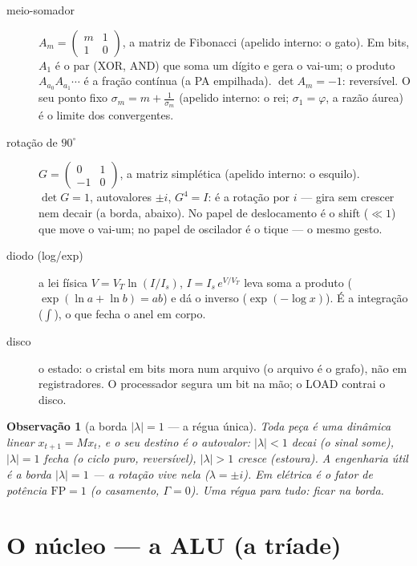 \documentclass[11pt,a4paper]{article}
\newtheorem{observacao}{Observação}
\begin{document}
\begin{description}
\item[meio-somador]
$A_{m}=\begin{pmatrix}m&1\\1&0\end{pmatrix}$, a matriz de Fibonacci (apelido interno: o gato).
Em bits, $A_{1}$ é o par (XOR, AND) que soma um dígito e gera o vai-um; o produto
$A_{a_{0}}A_{a_{1}}\cdots$ é a fração contínua (a PA empilhada). $\det A_{m}=-1$: reversível.
O seu ponto fixo $\sigma_{m}=m+\frac{1}{\sigma_{m}}$ (apelido interno: o rei; $\sigma_{1}=\varphi$, a razão áurea)
é o limite dos convergentes.

\item[rotação de $90^{\circ}$]
$G=\begin{pmatrix}0&1\\-1&0\end{pmatrix}$, a matriz simplética (apelido interno: o esquilo).
$\det G=1$, autovalores $\pm i$, $G^{4}=I$: é a rotação por $i$ --- gira sem crescer nem decair (a borda, abaixo).
No papel de deslocamento é o shift ($\ll 1$) que move o vai-um; no papel de oscilador é o tique --- o mesmo gesto.

\item[diodo (log/exp)]
a lei física $V=V_{T}\ln(I/I_{s})$, $I=I_{s}\,e^{V/V_{T}}$ leva soma a produto
($\exp(\ln a+\ln b)=ab$) e dá o inverso ($\exp(-\log x)$). É a integração ($\displaystyle\int$), o que fecha o anel em corpo.

\item[disco]
o estado: o cristal em bits mora num arquivo (o arquivo é o grafo), não em registradores.
O processador segura um bit na mão; o LOAD contrai o disco.
\end{description}

\begin{observacao}[a borda $|\lambda|=1$ --- a régua única]
Toda peça é uma dinâmica linear $x_{t+1}=M x_{t}$, e o seu destino é o autovalor:
$|\lambda|<1$ decai (o sinal some), $|\lambda|=1$ fecha (o ciclo puro, reversível),
$|\lambda|>1$ cresce (estoura). A engenharia útil é a borda $|\lambda|=1$ --- a rotação vive nela ($\lambda=\pm i$).
Em elétrica é o fator de potência $\mathrm{FP}=1$ (o casamento, $\Gamma=0$). Uma régua para tudo: ficar na borda.
\end{observacao}

\section{O núcleo --- a ALU (a tríade)}
\end{document}
